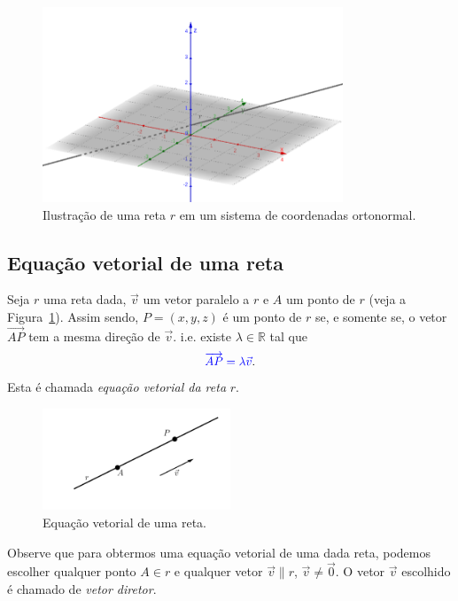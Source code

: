 \begin{figure}[H]
  \centering
  \includegraphics[width=0.8\textwidth]{cap_estudo/dados/fig_er_ilu0/fig}
  \caption{Ilustração de uma reta $r$ em um sistema de coordenadas ortonormal.}
\end{figure}

\subsection{Equação vetorial de uma reta}

Seja $r$ uma reta dada, $\vec{v}$ um vetor paralelo a $r$ e $A$ um ponto de $r$ (veja a Figura~\ref{fig:er_vet}). Assim sendo, $P=(x,y,z)$ é um ponto de $r$ se, e somente se, o vetor $\overrightarrow{AP}$ tem a mesma direção de $\vec{v}$. i.e. existe $\lambda\in\mathbb{R}$ tal que
\begin{equation}
  {\color{blue}\overrightarrow{AP} = \lambda\vec{v}}.
\end{equation}
Esta é chamada \emph{equação vetorial da reta} $r$.

\begin{figure}[H]
  \centering
  \includegraphics[width=0.5\textwidth]{./cap_estudo/dados/fig_er_vet/fig_er_vet}
  \caption{Equação vetorial de uma reta.}
  \label{fig:er_vet}
\end{figure}

Observe que para obtermos uma equação vetorial de uma dada reta, podemos escolher qualquer ponto $A\in r$ e qualquer vetor $\vec{v}\parallel r$, $\vec{v}\neq\vec{0}$. O vetor $\vec{v}$ escolhido é chamado de \emph{vetor diretor}.

